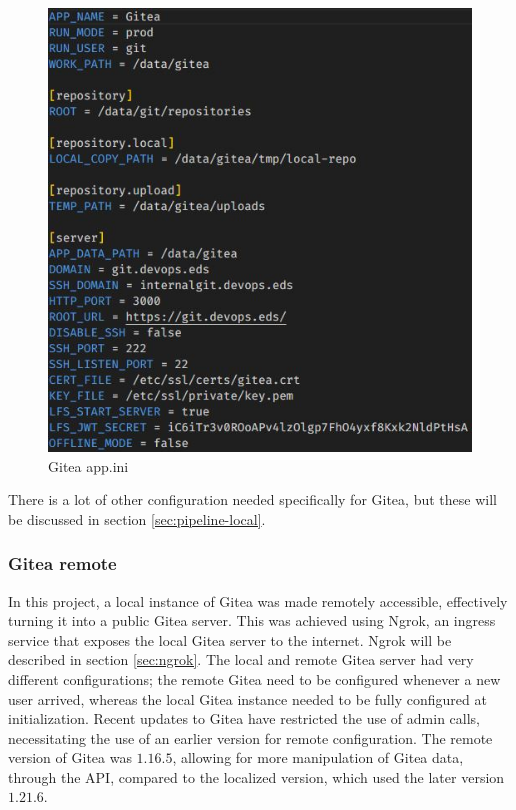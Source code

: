 \begin{figure}[h]
    \begin{center}
        \includegraphics[scale=.5]{images/Gitea-appin.JPG}
        \caption{Gitea app.ini}
        \label{fig:gitea_app_ini_remote}
    \end{center}
\end{figure}
There is a lot of other configuration needed specifically for Gitea, but these will be discussed in section \ref{sec:pipeline-local}.
\subsubsection{Gitea remote}
In this project, a local instance of Gitea was made remotely accessible, effectively turning it into a public Gitea server. 
This was achieved using Ngrok\cite{ngrok}, an ingress service that exposes the local Gitea server to the internet. 
Ngrok will be described in section \ref{sec:ngrok}. The local and remote Gitea server had very different configurations; the remote 
Gitea need to be configured whenever a new user arrived, whereas the local Gitea instance needed to be fully configured at initialization. 
Recent updates to Gitea have restricted the use of admin calls, necessitating the use of an earlier version for remote configuration. 
The remote version of Gitea was $1.16.5$, allowing for more manipulation of Gitea data, through the \ac{API},
compared to the localized version, which used the later version $1.21.6$.
